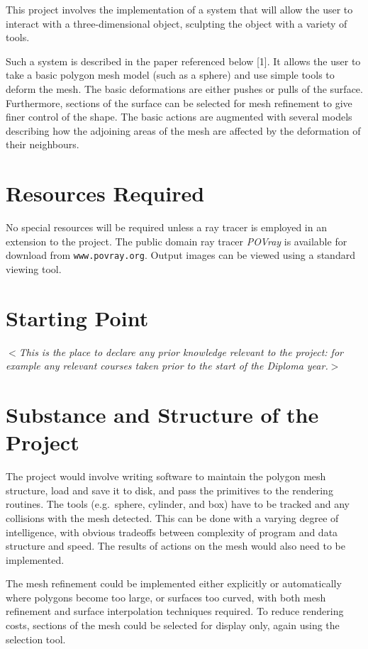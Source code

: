 \documentclass[12pt]{article}
\newcommand{\al}{$<$}
\newcommand{\ar}{$>$}
\begin{document}
This project involves the implementation of a system that will allow
the user to interact with a three-dimensional object, sculpting the
object with a variety of tools.

Such a system is described in the paper referenced below [1]. It
allows the user to take a basic polygon mesh model (such as a sphere)
and use simple tools to deform the mesh. The basic deformations are
either pushes or pulls of the surface. Furthermore, sections of the
surface can be selected for mesh refinement to give finer control of
the shape. The basic actions are augmented with several models
describing how the adjoining areas of the mesh are affected by the
deformation of their neighbours.


\section*{Resources Required}

No special resources will be required unless a ray tracer is employed
in an extension to the project.  The public domain ray tracer
\emph{POVray} is available for download from {\tt www.povray.org}.
Output images can be viewed using a standard viewing tool.


\section*{Starting Point}

\al\emph{This is the place to declare any prior knowledge relevant
to the project: for example any relevant courses taken prior to
the start of the Diploma year.}\ar


\section*{Substance and Structure of the Project}

The project would involve writing software to maintain the polygon
mesh structure, load and save it to disk, and pass the primitives to
the rendering routines. The tools (e.g.\ sphere, cylinder, and box)
have to be tracked and any collisions with the mesh detected. This can
be done with a varying degree of intelligence, with obvious tradeoffs
between complexity of program and data structure and speed. The
results of actions on the mesh would also need to be implemented.

The mesh refinement could be implemented either explicitly or
automatically where polygons become too large, or surfaces too curved,
with both mesh refinement and surface interpolation techniques
required. To reduce rendering costs, sections of the mesh could be
selected for display only, again using the selection tool.
\end{document}
